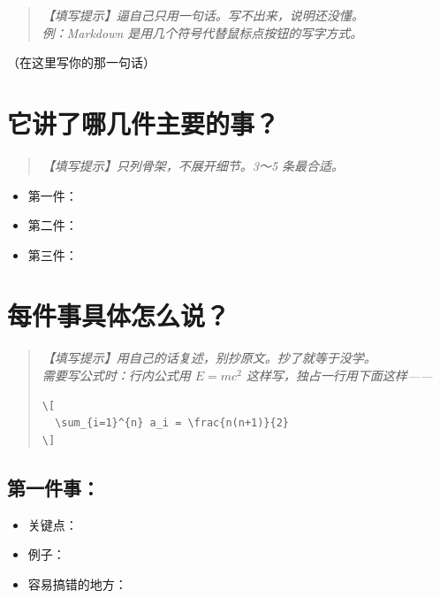 \begin{quote}
\itshape
【填写提示】逼自己只用一句话。写不出来，说明还没懂。\\
例：Markdown 是用几个符号代替鼠标点按钮的写字方式。
\end{quote}

（在这里写你的那一句话）


\section{它讲了哪几件主要的事？}

\begin{quote}
\itshape
【填写提示】只列骨架，不展开细节。3～5 条最合适。
\end{quote}

\begin{itemize}[leftmargin=*, itemsep=0.3em]
  \item 第一件：
  \item 第二件：
  \item 第三件：
\end{itemize}


\section{每件事具体怎么说？}

\begin{quote}
\itshape
【填写提示】用自己的话复述，别抄原文。抄了就等于没学。\\
需要写公式时：行内公式用 $E = mc^2$ 这样写，独占一行用下面这样——\\
\begin{verbatim}
\[
  \sum_{i=1}^{n} a_i = \frac{n(n+1)}{2}
\]
\end{verbatim}
\end{quote}

\subsection{第一件事：}

\begin{itemize}[leftmargin=*, itemsep=0.3em]
  \item 关键点：
  \item 例子：
  \item 容易搞错的地方：
\end{itemize}

